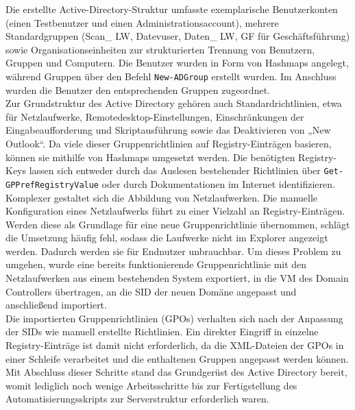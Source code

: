 \documentclass[a4paper,12pt]{article}
\begin{document}
Die erstellte Active-Directory-Struktur umfasste exemplarische Benutzerkonten (einen Testbenutzer und einen Administrationsaccount), mehrere Standardgruppen (Scan\_ LW, Datevuser, Daten\_ LW, GF für Geschäftsführung) sowie Organisationseinheiten zur strukturierten Trennung von Benutzern, Gruppen und Computern. 
Die Benutzer wurden in Form von Hashmaps angelegt, während Gruppen über den Befehl \lstinline|New-ADGroup| erstellt wurden. 
Im Anschluss wurden die Benutzer den entsprechenden Gruppen zugeordnet.\\

Zur Grundstruktur des Active Directory gehören auch Standardrichtlinien, etwa für Netzlaufwerke, Remotedesktop-Einstellungen, Einschränkungen der Eingabeaufforderung und Skriptausführung sowie das Deaktivieren von „New Outlook“. 
Da viele dieser Gruppenrichtlinien auf Registry-Einträgen basieren, können sie mithilfe von Hashmaps umgesetzt werden. 
Die benötigten Registry-Keys lassen sich entweder durch das Auslesen bestehender Richtlinien über \lstinline|Get-GPPrefRegistryValue| oder durch Dokumentationen im Internet identifizieren.\\

Komplexer gestaltet sich die Abbildung von Netzlaufwerken. Die manuelle Konfiguration eines Netzlaufwerks führt zu einer Vielzahl an Registry-Einträgen. 
Werden diese als Grundlage für eine neue Gruppenrichtlinie übernommen, schlägt die Umsetzung häufig fehl, sodass die Laufwerke nicht im Explorer angezeigt werden. 
Dadurch werden sie für Endnutzer unbrauchbar. 
Um dieses Problem zu umgehen, wurde eine bereits funktionierende Gruppenrichtlinie mit den Netzlaufwerken aus einem bestehenden System exportiert, in die VM des Domain Controllers übertragen, an die SID der neuen Domäne angepasst und anschlie\ss end importiert.\\

Die importierten Gruppenrichtlinien (GPOs) verhalten sich nach der Anpassung der SIDs wie manuell erstellte Richtlinien. 
Ein direkter Eingriff in einzelne Registry-Einträge ist damit nicht erforderlich, da die XML-Dateien der GPOs in einer Schleife verarbeitet und die enthaltenen Gruppen angepasst werden können. 
Mit Abschluss dieser Schritte stand das Grundgerüst des Active Directory bereit, womit lediglich noch wenige Arbeitsschritte bis zur Fertigstellung des Automatisierungsskripts zur Serverstruktur erforderlich waren.\\
\end{document}
